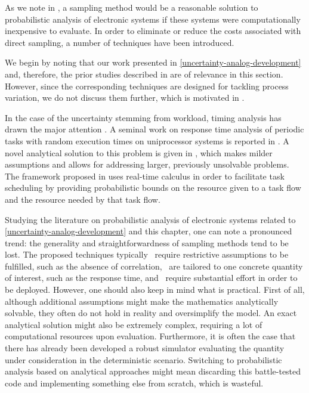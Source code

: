As we note in , a sampling method would be a reasonable solution to
probabilistic analysis of electronic systems if these systems were
computationally inexpensive to evaluate. In order to eliminate or reduce the
costs associated with direct sampling, a number of techniques have been
introduced.

We begin by noting that our work presented in
\cref{uncertainty-analog-development} and, therefore, the prior studies
described in  are of relevance in this section. However, since
the corresponding techniques are designed for tackling process variation, we do
not discuss them further, which is motivated in .

In the case of the uncertainty stemming from workload, timing analysis has drawn
the major attention \cite{quinton2012}. A seminal work on response time analysis
of periodic tasks with random execution times on uniprocessor systems is
reported in \cite{diaz2002}. A novel analytical solution to this problem is
given in \cite{tanasa2015}, which makes milder assumptions and allows for
addressing larger, previously unsolvable problems. The framework proposed in
\cite{santinelli2011} uses real-time calculus in order to facilitate task
scheduling by providing probabilistic bounds on the resource given to a task
flow and the resource needed by that task flow.

Studying the literature on probabilistic analysis of electronic systems related
to \cref{uncertainty-analog-development} and this chapter, one can note a
pronounced trend: the generality and straightforwardness of sampling methods
tend to be lost. The proposed techniques typically \one~require restrictive
assumptions to be fulfilled, such as the absence of correlation, \two~are
tailored to one concrete quantity of interest, such as the response time, and
\three~require substantial effort in order to be deployed. However, one should
also keep in mind what is practical. First of all, although additional
assumptions might make the mathematics analytically solvable, they often do not
hold in reality and oversimplify the model. An exact analytical solution might
also be extremely complex, requiring a lot of computational resources upon
evaluation. Furthermore, it is often the case that there has already been
developed a robust simulator evaluating the quantity under consideration in the
deterministic scenario. Switching to probabilistic analysis based on analytical
approaches might mean discarding this battle-tested code and implementing
something else from scratch, which is wasteful.

